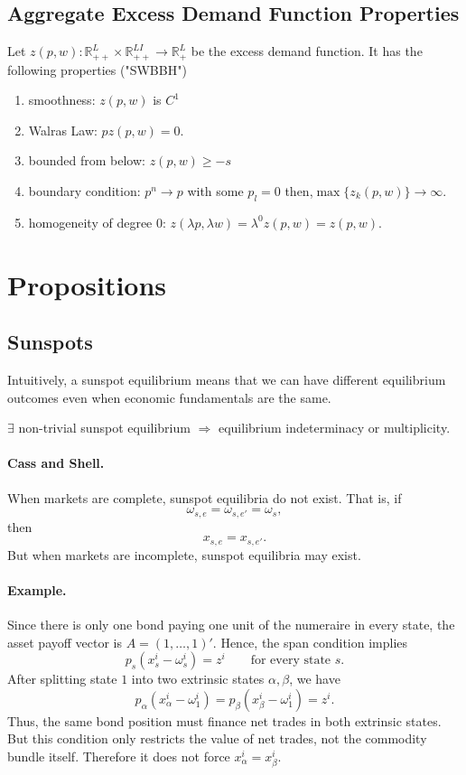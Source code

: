 \subsection{Aggregate Excess Demand Function Properties}
Let $z(p, w): \mathbb{R}_{++}^{L} \times \mathbb{R}_{++}^{LI} \rightarrow \mathbb{R}_{+}^{L}$ be the excess demand function. 
It has the following properties ("SWBBH")
\begin{enumerate}
    \item smoothness: $z(p, w)$ is $C^1$
    \item Walras Law: $p z(p, w) = 0$.
    \item bounded from below: $z(p, w) \geq -s $
    \item boundary condition: $p^n \rightarrow p$ with some $p_l = 0$ then,$\max \{z_k(p, w) \} \rightarrow \infty$. 
    \item homogeneity of degree $0$: $z(\lambda p, \lambda w) = \lambda^0 z(p, w) = z(p, w)$.
\end{enumerate}

\section{Propositions}

\subsection{Sunspots}

Intuitively, a sunspot equilibrium means that we can have different equilibrium outcomes even when economic fundamentals are the same.

\begin{tcolorbox}
$\exists$ non-trivial sunspot equilibrium 
$\Rightarrow$
 equilibrium indeterminacy or multiplicity.
\end{tcolorbox}

\paragraph{Cass and Shell.}
When markets are complete, sunspot equilibria do not exist. That is, if
\[
\omega_{s,e}=\omega_{s,e'}=\omega_s,
\]
then
\[
x_{s,e}=x_{s,e'}.
\]
But when markets are incomplete, sunspot equilibria may exist.

\paragraph{Example.}
Since there is only one bond paying one unit of the numeraire in every state,
the asset payoff vector is \(A=(1,\dots,1)'\). Hence, the span condition implies
\[
p_s(x_s^i-\omega_s^i)=z^i
\qquad \text{for every state }s.
\]
After splitting state \(1\) into two extrinsic states \(\alpha,\beta\), we have
\[
p_\alpha(x_\alpha^i-\omega_1^i)
=
p_\beta(x_\beta^i-\omega_1^i)
=
z^i.
\]
Thus, the same bond position must finance net trades in both extrinsic states.
But this condition only restricts the value of net trades, not the commodity bundle
itself. Therefore it does not force \(x_\alpha^i=x_\beta^i\).

